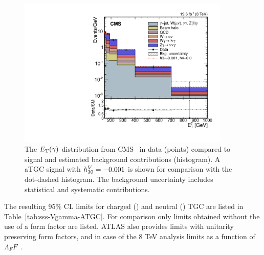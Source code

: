 % 
\begin{figure}[htbp]
  \begin{center}
  \includegraphics[width=0.9\textwidth]{figures/sss-inclboson-diboson-Vgamma-zgamvvgamptgam.pdf}
  \caption{ 
  The $E_{\mathrm{T}}(\gamma)$ distribution from CMS~\cite{Khachatryan:2016yro} in data (points) compared to signal and estimated background contributions (histogram). A aTGC signal with $h_{30}^V=-0.001$ is 
  shown for comparison with the dot-dashed histogram. The background uncertainty includes statistical and systematic contributions. 
}
\label{fig:sss-inclboson-diboson-Vgamma-zgamvvgamptgam}
\end{center}
\end{figure}

The resulting 95\% CL limits for charged (\Wg) and neutral (\Zg) TGC are listed in Table~\ref{tab:sss-Vgamma-ATGC}. For comparison only limits obtained without the use of a form factor are listed. ATLAS
also provides limits with unitarity preserving form factors, and in case of the 8 TeV analysis limits as a function of $\Lambda_FF$~\cite{Aad:2016sau}. 

